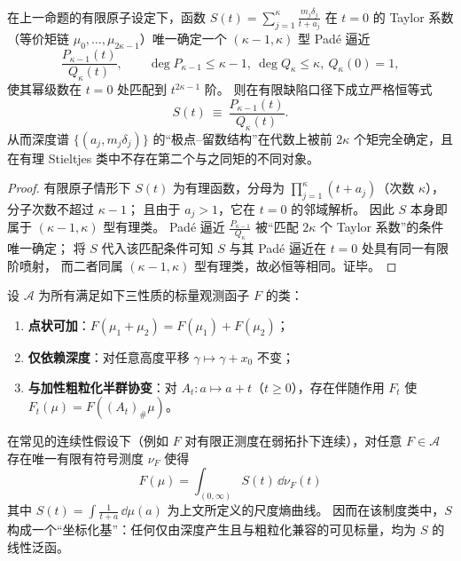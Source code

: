 \begin{corollary}\label{cor:xi-pade-hankel-exact-inversion}
在上一命题的有限原子设定下，函数 \(S(t)=\sum_{j=1}^{\kappa}\frac{m_j\delta_j}{t+a_j}\) 在 \(t=0\) 的 Taylor 系数（等价矩链 \(\mu_0,\dots,\mu_{2\kappa-1}\)）唯一确定一个 \((\kappa-1,\kappa)\) 型 Pad\'e 逼近
\[
\frac{P_{\kappa-1}(t)}{Q_{\kappa}(t)},
\qquad
\deg P_{\kappa-1}\le \kappa-1,\ \deg Q_{\kappa}\le \kappa,\ Q_{\kappa}(0)=1,
\]
使其幂级数在 \(t=0\) 处匹配到 \(t^{2\kappa-1}\) 阶。
则在有限缺陷口径下成立严格恒等式
\[
\boxed{\;
S(t)\ \equiv\ \frac{P_{\kappa-1}(t)}{Q_{\kappa}(t)}.\;}
\]
从而深度谱 \(\{(a_j,m_j\delta_j)\}\) 的“极点--留数结构”在代数上被前 \(2\kappa\) 个矩完全确定，且在有理 Stieltjes 类中不存在第二个与之同矩的不同对象。
\end{corollary}
\begin{proof}
有限原子情形下 \(S(t)\) 为有理函数，分母为 \(\prod_{j=1}^{\kappa}(t+a_j)\)（次数 \(\kappa\)），分子次数不超过 \(\kappa-1\)；
且由于 \(a_j>1\)，它在 \(t=0\) 的邻域解析。
因此 \(S\) 本身即属于 \((\kappa-1,\kappa)\) 型有理类。
Pad\'e 逼近 \(\frac{P_{\kappa-1}}{Q_{\kappa}}\) 被“匹配 \(2\kappa\) 个 Taylor 系数”的条件唯一确定；
将 \(S\) 代入该匹配条件可知 \(S\) 与其 Pad\'e 逼近在 \(t=0\) 处具有同一有限阶喷射，
而二者同属 \((\kappa-1,\kappa)\) 型有理类，故必恒等相同。证毕。
\end{proof}

\begin{proposition}
设 \(\mathcal{A}\) 为所有满足如下三性质的标量观测函子 \(F\) 的类：
\begin{enumerate}
  \item \textbf{点状可加}：\(F(\mu_1+\mu_2)=F(\mu_1)+F(\mu_2)\)；
  \item \textbf{仅依赖深度}：对任意高度平移 \(\gamma\mapsto\gamma+x_0\) 不变；
  \item \textbf{与加性粗粒化半群协变}：对 \(A_t:a\mapsto a+t\)（\(t\ge0\)），存在伴随作用 \(F_t\) 使 \(F_t(\mu)=F((A_t)_\#\mu)\)。
\end{enumerate}
在常见的连续性假设下（例如 \(F\) 对有限正测度在弱拓扑下连续），对任意 \(F\in\mathcal{A}\) 存在唯一有限有符号测度 \(\nu_F\) 使得
\[
\boxed{\;
F(\mu)=\int_{(0,\infty)} S(t)\,\dd\nu_F(t)\;}
\]
其中 \(S(t)=\int \frac{1}{t+a}\,\dd\mu(a)\) 为上文所定义的尺度熵曲线。
因而在该制度类中，\(S\) 构成一个“坐标化基”：任何仅由深度产生且与粗粒化兼容的可见标量，均为 \(S\) 的线性泛函。
\end{proposition}

